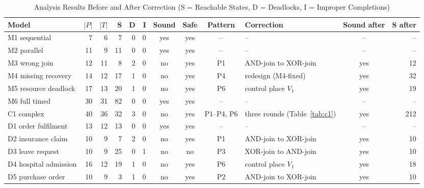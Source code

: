 \documentclass[conference]{IEEEtran}
\begin{document}
\begin{table}[htbp]
\caption{Analysis Results Before and After Correction (S = Reachable States, D = Deadlocks, I = Improper Completions)}
\begin{center}
\begin{tabular}{|l|r|r|r|r|r|c|c|c|l|c|r|}
\hline
\textbf{Model} & $|P|$ & $|T|$ & \textbf{S} & \textbf{D} & \textbf{I} & \textbf{Sound} & \textbf{Safe} &
\textbf{Pattern} & \textbf{Correction} & \textbf{Sound after} & \textbf{S after} \\
\hline
M1 sequential        & 7  & 6  & 7  & 0 & 0 & yes & yes & --  & --                                & --  & -- \\
M2 parallel          & 11 & 9  & 11 & 0 & 0 & yes & yes & --  & --                                & --  & -- \\
M3 wrong join        & 12 & 11 & 8  & 2 & 0 & no  & yes & P1  & AND-join to XOR-join              & yes & 12 \\
M4 missing recovery  & 14 & 12 & 17 & 1 & 0 & no  & yes & P4  & redesign (M4-fixed)               & yes & 32 \\
M5 resource deadlock & 17 & 13 & 20 & 1 & 0 & no  & yes & P6  & control place $V_1$               & yes & 19 \\
M6 full timed        & 30 & 31 & 82 & 0 & 0 & yes & yes & --  & --                                & --  & -- \\
C1 complex           & 40 & 36 & 32 & 3 & 0 & no  & yes & P1--P4, P6 & three rounds (Table~\ref{tab:c1}) & yes & 212 \\
\hline
D1 order fulfilment  & 13 & 12 & 13 & 0 & 0 & yes & yes & --  & --                                & --  & -- \\
D2 insurance claim   & 10 & 9  & 7  & 2 & 0 & no  & yes & P1  & AND-join to XOR-join              & yes & 10 \\
D3 leave request     & 10 & 9  & 25 & 0 & 1 & no  & no  & P3  & XOR-join to AND-join              & yes & 10 \\
D4 hospital admission& 16 & 12 & 19 & 1 & 0 & no  & yes & P6  & control place $V_1$               & yes & 18 \\
D5 purchase order    & 10 & 9  & 3  & 1 & 0 & no  & yes & P2  & AND-join to XOR-join              & yes & 10 \\
\hline
\end{tabular}
\label{tab:res}
\end{center}
\end{table}
\end{document}
